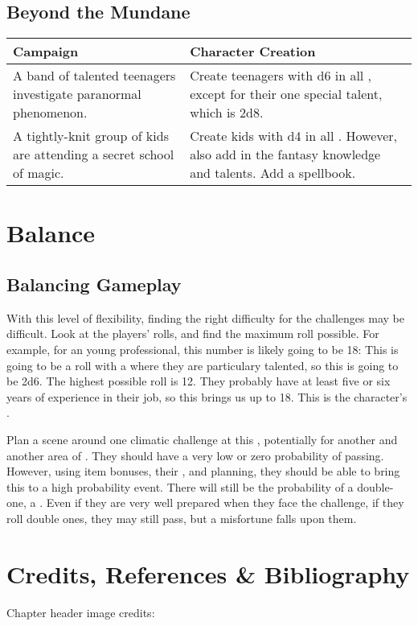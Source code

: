\documentclass{LegrandOrangeTufteBook}
\begin{document}
\subsection*{Beyond the Mundane}
\begin{center}
	\begin{xltabular}{\textwidth}{XX}
		Campaign & Character Creation \\
		\hline
		A band of talented teenagers investigate paranormal phenomenon. & Create teenagers with d6 in all , except for their one special talent, which is 2d8.\\
   		A tightly-knit group of kids are attending a secret school of magic. & Create kids with d4 in all . However, also add in the fantasy knowledge and talents. Add a spellbook. \\
	\end{xltabular}
\end{center}

\section*{Balance}

\subsection*{Balancing Gameplay}

With this level of flexibility, finding the right difficulty for the challenges may be difficult. Look at the players' rolls, and find the maximum roll possible. For example, for an young professional,
this number is likely going to be 18: This is going to be a roll with a  where they are particulary talented, so this is going to be 2d6. The highest possible roll is 12. They probably have at least five or six years of experience in their job, so this brings us up to 18. This is the character's .

Plan a scene around one climatic challenge at this , potentially for another  and another area of . They should have a very low or zero probability of passing. However, using item bonuses, their , and planning, they should be able to bring this to a high probability event. There will still be the probability of a double-one, a . Even if they are very well prepared when they face the challenge, if they roll double ones, they may still pass, but a misfortune falls upon them.

\section*{Credits, References \& Bibliography}

Chapter header image credits: \cite{baby_faces}

\printbibliography[heading=none]
\end{document}

